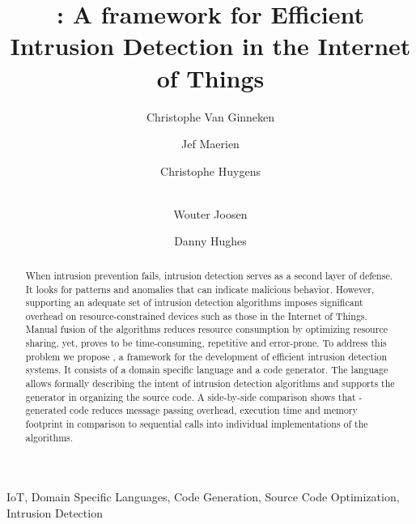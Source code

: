 \documentclass[3p,times,procedia]{elsarticle}
\begin{document}
\begin{frontmatter}


\title{
\NAME: A framework for Efficient Intrusion Detection in the Internet of Things
}

\author[a]{Christophe Van Ginneken}
\author[a]{Jef Maerien}
\author[a]{Christophe Huygens}
\author[a]{\\Wouter Joosen}
\author[a]{Danny Hughes}

\address[a]{
iMinds-DistriNet, KU Leuven, 3001 Leuven, Belgium\\
\{firstname.lastname\}@cs.kuleuven.be
}

\begin{abstract}

When intrusion prevention fails, intrusion detection serves as a second layer
of defense. It looks for patterns and anomalies that can indicate malicious
behavior. However, supporting an adequate set of intrusion detection algorithms
imposes significant overhead on resource-constrained devices such as those in
the Internet of Things. Manual fusion of the algorithms reduces resource
consumption by optimizing resource sharing, yet, proves to be time-consuming,
repetitive and error-prone. To address this problem we propose \NAME, a
framework for the development of efficient intrusion detection systems. It
consists of a domain specific language and a code generator. The language
allows formally describing the intent of intrusion detection algorithms and
supports the generator in organizing the source code. A side-by-side comparison
shows that \NAME-generated code reduces message passing overhead, execution
time and memory footprint in comparison to sequential calls into individual
implementations of the algorithms.

\end{abstract}

\begin{keyword}

IoT, Domain Specific Languages, Code Generation, Source Code Optimization,
Intrusion Detection

\end{keyword}

\end{frontmatter}
\end{document}
